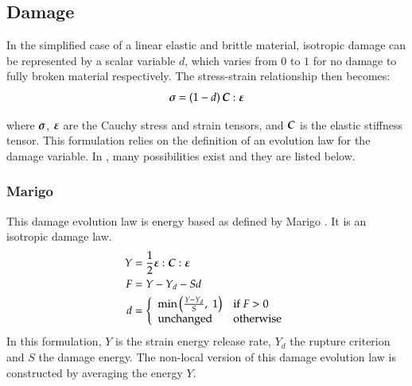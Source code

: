 \subsection{Damage}

In the  simplified case of a  linear elastic and brittle  material, isotropic
damage can be represented by a scalar variable $d$, which varies from $0$ to $1$
for  no  damage  to  fully  broken  material  respectively.  The  stress-strain
relationship then becomes:
\begin{equation*}
  \boldsymbol{\sigma} = (1-d)\, \boldsymbol{C}:\boldsymbol{\varepsilon}
\end{equation*}

where  $\boldsymbol{\sigma}$,  $\boldsymbol{\varepsilon}$ are  the  Cauchy  stress and  strain
tensors, and $\boldsymbol{C}$ is the elastic stiffness tensor. This formulation relies
on the definition of an evolution law for the damage variable. In \akantu, many
possibilities exist and they are listed below.

\subsubsection{Marigo}

This damage evolution law is energy based as defined by Marigo \cite{marigo81a,
  lemaitre96a}. It is an isotropic damage law.
\begin{align}
  Y &= \frac{1}{2}\boldsymbol{\varepsilon}:\boldsymbol{C}:\boldsymbol{\varepsilon}\\
  F &= Y - Y_d - S d\\
  d &= \left\{
    \begin{array}{l l}
      \mathrm{min}\left(\frac{Y-Y_d}{S},\;1\right) & \mathrm{if}\; F > 0\\
      \mathrm{unchanged} & \mathrm{otherwise}
    \end{array}
  \right.
\end{align}
In this formulation, $Y$ is the strain energy release rate, $Y_d$ the
rupture criterion and $S$ the damage energy.  The non-local version of
this damage evolution law is constructed by averaging the energy $Y$.

